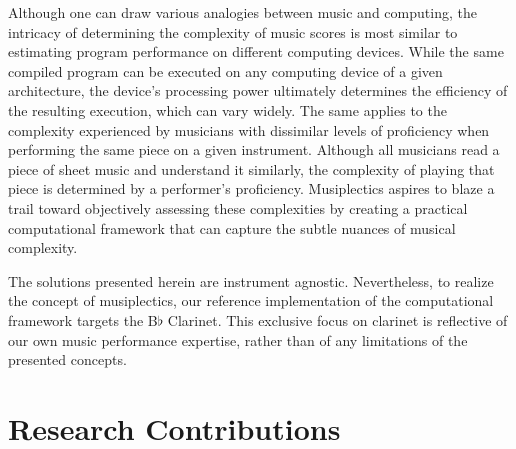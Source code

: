 \documentclass[12pt]{report}
\begin{document}
Although one can draw various analogies between music and computing, the intricacy of determining the complexity of music scores is most similar to estimating program performance on different computing devices. While the same compiled program can be executed on any computing device of a given architecture, the device's processing power ultimately determines the efficiency of the resulting execution, which can vary widely. The same applies to the complexity experienced by musicians with dissimilar levels of proficiency when performing the same piece on a given instrument. Although all musicians read a piece of sheet music and understand it similarly, the complexity of playing that piece is determined by a performer's proficiency. Musiplectics aspires to blaze a trail toward objectively assessing these complexities by creating a practical computational framework that can capture the subtle nuances of musical complexity.

The solutions presented herein are instrument agnostic. Nevertheless, to realize the concept of musiplectics, our reference implementation of the computational framework targets the B$\flat$ Clarinet. This exclusive focus on clarinet is reflective of our own music performance expertise, rather than of any limitations of the presented concepts.

\section{Research Contributions} 
\label{sec:rqg}




\end{document}
